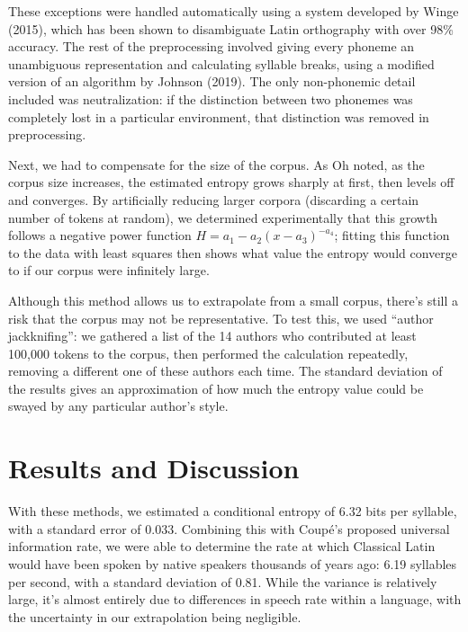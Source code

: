 \documentclass[12pt]{article}
\begin{document}
These exceptions were handled automatically using a system developed by Winge (2015), which has been shown to disambiguate Latin orthography with over 98\% accuracy. The rest of the preprocessing involved giving every phoneme an unambiguous representation and calculating syllable breaks, using a modified version of an algorithm by Johnson (2019). The only non-phonemic detail included was neutralization: if the distinction between two phonemes was completely lost in a particular environment, that distinction was removed in preprocessing.

Next, we had to compensate for the size of the corpus. As Oh noted, as the corpus size increases, the estimated entropy grows sharply at first, then levels off and converges. By artificially reducing larger corpora (discarding a certain number of tokens at random), we determined experimentally that this growth follows a negative power function \( H = a_1 - a_2 (x - a_3)^{-a_4} \); fitting this function to the data with least squares then shows what value the entropy would converge to if our corpus were infinitely large.


Although this method allows us to extrapolate from a small corpus, there's still a risk that the corpus may not be representative. To test this, we used ``author jackknifing'': we gathered a list of the 14 authors who contributed at least 100,000 tokens to the corpus, then performed the calculation repeatedly, removing a different one of these authors each time. The standard deviation of the results gives an approximation of how much the entropy value could be swayed by any particular author's style.

\section{Results and Discussion}

With these methods, we estimated a conditional entropy of 6.32 bits per syllable, with a standard error of 0.033. Combining this with Coupé's proposed universal information rate, we were able to determine the rate at which Classical Latin would have been spoken by native speakers thousands of years ago: 6.19 syllables per second, with a standard deviation of 0.81. While the variance is relatively large, it's almost entirely due to differences in speech rate within a language, with the uncertainty in our extrapolation being negligible.
\end{document}
